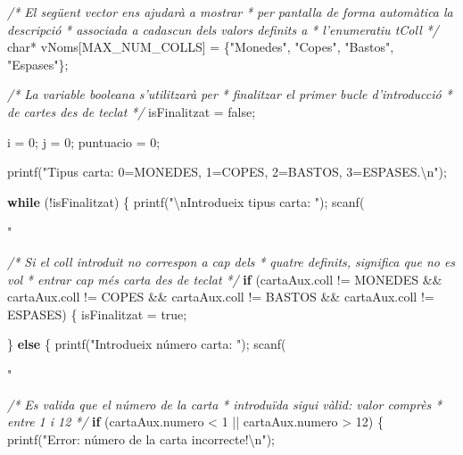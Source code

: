 \documentclass[]{book}
\newenvironment{Shaded}{\begin{snugshade}}{\end{snugshade}}
\newcommand{\DataTypeTok}[1]{\textcolor[rgb]{0.13,0.29,0.53}{#1}}
\newcommand{\DecValTok}[1]{\textcolor[rgb]{0.00,0.00,0.81}{#1}}
\newcommand{\SpecialCharTok}[1]{\textcolor[rgb]{0.00,0.00,0.00}{#1}}
\newcommand{\StringTok}[1]{\textcolor[rgb]{0.31,0.60,0.02}{#1}}
\newcommand{\CommentTok}[1]{\textcolor[rgb]{0.56,0.35,0.01}{\textit{#1}}}
\newcommand{\ControlFlowTok}[1]{\textcolor[rgb]{0.13,0.29,0.53}{\textbf{#1}}}
\newcommand{\NormalTok}[1]{#1}
\begin{document}
\begin{Shaded}
\begin{Highlighting}[]
    \CommentTok{/* El següent vector ens ajudarà a mostrar}
\CommentTok{     * per pantalla de forma automàtica la descripció }
\CommentTok{     * associada a cadascun dels valors definits a }
\CommentTok{     * l'enumeratiu tColl}
\CommentTok{     */}
    \DataTypeTok{char}\NormalTok{* vNoms[MAX_NUM_COLLS] = \{}\StringTok{"Monedes"}\NormalTok{, }\StringTok{"Copes"}\NormalTok{, }\StringTok{"Bastos"}\NormalTok{, }\StringTok{"Espases"}\NormalTok{\};}

    \CommentTok{/* La variable booleana s'utilitzarà per}
\CommentTok{     * finalitzar el primer bucle d'introducció}
\CommentTok{     * de cartes des de teclat}
\CommentTok{     */}
\NormalTok{    isFinalitzat = false;}
    
\NormalTok{    i = }\DecValTok{0}\NormalTok{;}
\NormalTok{    j = }\DecValTok{0}\NormalTok{;}
\NormalTok{    puntuacio = }\DecValTok{0}\NormalTok{;}
    
\NormalTok{    printf(}\StringTok{"Tipus carta: 0=MONEDES, 1=COPES, 2=BASTOS, 3=ESPASES.}\SpecialCharTok{\textbackslash{}n}\StringTok{"}\NormalTok{);}

    \ControlFlowTok{while}\NormalTok{ (!isFinalitzat) \{}
\NormalTok{        printf(}\StringTok{"}\SpecialCharTok{\textbackslash{}n}\StringTok{Introdueix tipus carta: "}\NormalTok{);}
\NormalTok{        scanf(}\StringTok{"%
        
        \CommentTok{/* Si el coll introduit no correspon a cap dels}
\CommentTok{         * quatre definits, significa que no es vol }
\CommentTok{         * entrar cap més carta des de teclat}
\CommentTok{         */}
        \ControlFlowTok{if}\NormalTok{ (cartaAux.coll != MONEDES && cartaAux.coll != COPES}
\NormalTok{            && cartaAux.coll != BASTOS && cartaAux.coll != ESPASES) \{}
\NormalTok{            isFinalitzat = true;}

\NormalTok{        \} }\ControlFlowTok{else}\NormalTok{ \{}
\NormalTok{            printf(}\StringTok{"Introdueix número carta: "}\NormalTok{);}
\NormalTok{            scanf(}\StringTok{"%
            
            \CommentTok{/* Es valida que el número de la carta}
\CommentTok{             * introduïda sigui vàlid: valor comprès}
\CommentTok{             * entre 1 i 12}
\CommentTok{             */}
            \ControlFlowTok{if}\NormalTok{ (cartaAux.numero < }\DecValTok{1}\NormalTok{ || cartaAux.numero > }\DecValTok{12}\NormalTok{) \{}
\NormalTok{                printf(}\StringTok{"Error: número de la carta incorrecte!}\SpecialCharTok{\textbackslash{}n}\StringTok{"}\NormalTok{);}
                
}}
\end{Highlighting}
\end{Shaded}
\end{document}
